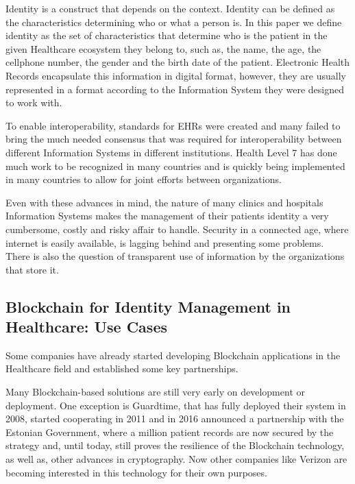 \documentclass[]{llncs}
\begin{document}
Identity is a construct that depends on the context.  Identity can be
defined as the characteristics determining who or what a person is.
In this paper we define identity as the set of characteristics that
determine who is the patient in the given Healthcare ecosystem they
belong to, such as, the name, the age, the cellphone number, the
gender and the birth date of the patient.  Electronic Health Records
encapsulate this information in digital format, however, they are
usually represented in a format according to the Information System
they were designed to work with.

To enable interoperability, standards for EHRs were created and many
failed to bring the much needed consensus that was required for
interoperability between different Information Systems in different
institutions.  Health Level 7 has done much work to be recognized in
many countries and is quickly being implemented in many countries to
allow for joint efforts between organizations.

Even with these advances in mind, the nature of many clinics and hospitals Information Systems 
makes the management of their patients identity a very cumbersome, costly and risky affair to handle. 
Security in a connected age, where internet is easily available, is lagging behind 
and presenting some problems. 
There is also the question of transparent use of information by the organizations 
that store it.
%

\subsection{Blockchain for Identity Management in Healthcare: Use Cases}
Some companies have already started developing Blockchain applications in the Healthcare field 
and established some key partnerships.

Many Blockchain-based solutions are still very early on development or deployment. 
One exception is Guardtime, that has fully deployed their system in 2008, started cooperating in 2011 
and in 2016 announced a partnership with the Estonian Government, where a million patient records 
are now secured by the strategy and, until today, still proves the resilience of the Blockchain 
technology, as well as, other advances in cryptography. 
Now other companies like Verizon are becoming interested in this technology for their own purposes.
\cite{GuardTime2018,EstonianGovernmentGuardTime2016}
\end{document}

